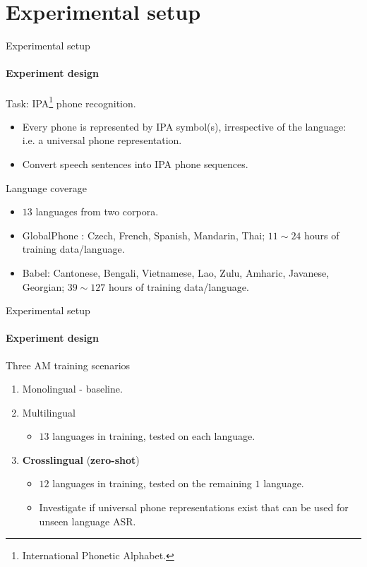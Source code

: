 \documentclass{beamer}
\begin{document}
\section{Experimental setup}
\begin{frame}{Experimental setup}
\framesubtitle{Experiment design}

\begin{block}{Task: IPA\footnote{International Phonetic Alphabet.} phone recognition.}
\begin{itemize}
    \item Every phone is represented by IPA symbol(s), irrespective of the language: i.e. a universal phone representation.
    \item Convert speech sentences into  IPA phone sequences. 
\end{itemize}
\end{block}
\begin{block}{Language coverage}
\begin{itemize}
    \item $13$ languages from two corpora.
    \item GlobalPhone \cite{Schultz02globalphone}: Czech, French, Spanish, Mandarin, Thai; $11\sim 24$ hours of training data/language.
    \item Babel: Cantonese, Bengali, Vietnamese, Lao, Zulu, Amharic, Javanese, Georgian; $39\sim 127$ hours of training data/language.
\end{itemize}

\end{block}
    
\end{frame}
\begin{frame}{Experimental setup}
\framesubtitle{Experiment design}
\begin{block}{Three AM training scenarios}
\begin{enumerate}
    \item Monolingual - baseline.
    \item Multilingual 
           \begin{itemize}
            \item $13$ languages in training, tested on each language.
        \end{itemize}
    \item \textbf{Crosslingual} (\textbf{zero-shot})
    \begin{itemize}
            \item $12$ languages in training, tested on the remaining $1$ language.
            \item Investigate if universal phone representations exist that can be used for unseen language ASR.
        \end{itemize}
\end{enumerate}
     
\end{block}


    
\end{frame}
\end{document}
